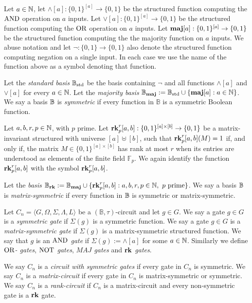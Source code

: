 \documentclass[../paper.tex]{subfiles}
\begin{document}
Let $a \in \mathbb{N}$, let $\land[a] : \{0,1\}^{[a]} \rightarrow \{0,1\}$ be the
structured function computing the $\text{\upshape AND}$ operation on $a$ inputs. Let $\lor[a] :
\{0,1\}^{[a]} \rightarrow \{0,1\}$ be the structured function computing the
$\text{\upshape OR}$ operation on $a$ inputs. Let $\text{\textbf{maj}} [a] : \{0,1\}^{[a]} \rightarrow
\{0,1\}$ be the structured function computing the the majority function on $a$
inputs. We abuse notation and let $\neg : \{0,1\} \rightarrow \{0,1\}$ also
denote the structured function computing negation on a single input. In each
case we use the name of the function above as a symbol denoting that function.

Let the \emph{standard basis} $\mathbb{B}_{\text{std}}$ be the basis containing $\neg$ and all
functions $\land[a]$ and $\lor[a]$ for every $a \in \mathbb{N}$. Let the
\emph{majority basis }$\mathbb{B}_{\text{\textbf{maj}}} := \mathbb{B}_{\text{std}} \cup \{\text{\textbf{maj}}[a] : a \in \mathbb{N}\}$. We say a
basis $\mathbb{B}$ is \emph{symmetric} if every function in $\mathbb{B}$ is a symmetric
Boolean function.

Let $a, b, r, p \in \mathbb{N}$, with $p$ prime. Let $\text{\textbf{rk}}^r_p[a,b] : \{0,1\}^{[a]
  \times [b]} \rightarrow \{0,1\}$ be a matrix-invariant structured with
universe $[a] \uplus [b]$, such that $\text{\textbf{rk}}^r_p[a,b](M) = 1$ if, and only if,
the matrix $M \in \{0,1\}^{[a] \times [b]}$ has rank at most $r$ when its
entries are understood as elements of the finite field $\mathbb{F}_p$. We again
identify the function $\text{\textbf{rk}}^{r}_p[a,b]$ with the symbol $\text{\textbf{rk}}^{r}_p[a,b]$.

Let the \emph{\rank basis} $\mathbb{B}_{\text{\textbf{rk}}} := \mathbb{B}_{\text{\textbf{maj}}} \cup \{\text{\textbf{rk}}^{r}_p[a,b] : a, b, r, p \in
\mathbb{N}, \text{ $p$ prime}\}$. We say a basis $\mathbb{B}$ is \emph{matrix-symmetric} if
every function in $\mathbb{B}$ is symmetric or matrix-symmetric.


Let $C_n = \langle G, \Omega, \Sigma, \Lambda, L \rangle$ be a $(\mathbb{B},
\tau)$-circuit and let $g \in G$. We say a gate $g \in G$ is a \emph{symmetric
  gate} if $\Sigma(g)$ is a symmetric function. We say a gate $g \in G$ is a
\emph{matrix-symmetric gate} if $\Sigma(g)$ is a matrix-symmetric structured
function. We say that $g$ is an \emph{$\text{\upshape AND}$ gate} if $\Sigma(g) := \land [a]$
for some $a \in \mathbb{N}$. Similarly we define \emph{$\text{\upshape OR}$- gates}, \emph{$\text{\upshape NOT}$
  gates}, \emph{$MAJ$ gates} and \emph{$\text{\textbf{rk}}$ gates}.

We say $C_n$ is a \emph{circuit with symmetric gates} if every gate in $C_n$ is
symmetric. We say $C_n$ is a \emph{matrix-circuit} if every gate in $C_n$ is
matrix-symmetric or symmetric. We say $C_n$ is a \emph{rank-circuit} if $C_n$ is
a matrix-circuit and every non-symmetric gate is a $\text{\textbf{rk}}$ gate.
\end{document}
